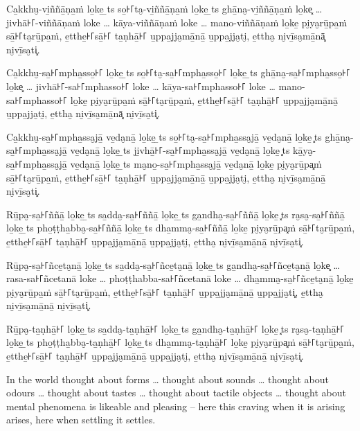 \paliPage

Ca̱kkhu̮-vi̱ññā̱ṇa̱ṁ lo̱ke̱ \ldo̱ts{} so̱꜔꜒ta̮-vi̱ññā̱ṇa̱ṁ lo̱ke̱ \ldo̱ts{} ghā̱na̮-vi̱ññā̱ṇa̱ṁ lo̱ke͓
\ldots{} jivhā꜔꜒-viññāṇaṁ loke \ldots{} kāya-viññāṇaṁ loke \ldots{} mano-viññāṇaṁ
lo̱ke̱ pi̮ya̮rū̱pa̱ṁ sā̱꜔꜒ta̮rū̱pa̱ṁ, e̱tthe̱꜔꜒sā̱꜔꜒ ta̱ṇhā̱꜔꜒ u̱ppa̱jja̮mā̱nā̱ u̱ppa̱jja̮ti̮, e̱ttha̮ ni̮vī̱sa̮mā̱nā͓
ni̮vī̱sa̮ti͓.

Ca̱kkhu̮-sa̱꜔꜒mpha̱sso̱꜔꜒ lo̱ke̱ \ldo̱ts{} so̱꜔꜒ta̮-sa̱꜔꜒mpha̱sso̱꜔꜒ lo̱ke̱ \ldo̱ts{} ghā̱na̮-sa̱꜔꜒mpha̱sso̱꜔꜒ lo̱ke͓
\ldots{} jivhā꜔꜒-sa꜔꜒mphasso꜔꜒ loke \ldots{} kāya-sa꜔꜒mphasso꜔꜒ loke \ldots{} mano-sa꜔꜒mphasso꜔꜒
lo̱ke̱ pi̮ya̮rū̱pa̱ṁ sā̱꜔꜒ta̮rū̱pa̱ṁ, e̱tthe̱꜔꜒sā̱꜔꜒ ta̱ṇhā̱꜔꜒ u̱ppa̱jja̮mā̱nā̱ u̱ppa̱jja̮ti̮, e̱ttha̮ ni̮vī̱sa̮mā̱nā͓
ni̮vī̱sa̮ti͓.

Ca̱kkhu̮-sa̱꜔꜒mpha̱ssa̮jā̱ ve̱da̮nā̱ lo̱ke̱ \ldo̱ts{} so̱꜔꜒ta̮-sa̱꜔꜒mpha̱ssa̮jā̱ ve̱da̮nā̱ lo̱ke̱ \ldo͓ts{}
ghā̱na̮-sa̱꜔꜒mpha̱ssa̮jā̱ ve̱da̮nā̱ lo̱ke̱ \ldo̱ts{} ji̱vhā̱꜔꜒-sa̱꜔꜒mpha̱ssa̮jā̱ ve̱da̮nā̱ lo̱ke̱ \ldo͓ts{}
kā̱ya̮-sa̱꜔꜒mpha̱ssa̮jā̱ ve̱da̮nā̱ lo̱ke̱ \ldo̱ts{} ma̮no̱-sa̱꜔꜒mpha̱ssa̮jā̱ ve̱da̮nā̱ lo̱ke̱ pi̮ya̮rū̱pa͓ṁ
sā̱꜔꜒ta̮rū̱pa̱ṁ, e̱tthe̱꜔꜒sā̱꜔꜒ ta̱ṇhā̱꜔꜒ u̱ppa̱jja̮mā̱nā̱ u̱ppa̱jja̮ti̮, e̱ttha̮ ni̮vī̱sa̮mā̱nā̱ ni̮vī̱sa̮ti͓.

Rū̱pa̮-sa̱꜔꜒ññā̱ lo̱ke̱ \ldo̱ts{} sa̱dda̮-sa̱꜔꜒ññā̱ lo̱ke̱ \ldo̱ts{} ga̱ndha̮-sa̱꜔꜒ññā̱ lo̱ke̱ \ldo͓ts{}
ra̮sa̮-sa̱꜔꜒ññā̱ lo̱ke̱ \ldo̱ts{} pho̱ṭṭha̱bba̮-sa̱꜔꜒ññā̱ lo̱ke̱ \ldo̱ts{} dha̱mma̮-sa̱꜔꜒ññā̱ lo̱ke̱ pi̮ya̮rū̱pa͓ṁ
sā̱꜔꜒ta̮rū̱pa̱ṁ, e̱tthe̱꜔꜒sā̱꜔꜒ ta̱ṇhā̱꜔꜒ u̱ppa̱jja̮mā̱nā̱ u̱ppa̱jja̮ti̮, e̱ttha̮ ni̮vī̱sa̮mā̱nā̱ ni̮vī̱sa̮ti͓.

Rū̱pa̮-sa̱꜔꜒ñce̱ta̮nā̱ lo̱ke̱ \ldo̱ts{} sa̱dda̮-sa̱꜔꜒ñce̱ta̮nā̱ lo̱ke̱ \ldo̱ts{} ga̱ndha̮-sa̱꜔꜒ñce̱ta̮nā̱ lo̱ke͓
\ldots{} rasa-sa꜔꜒ñcetanā loke \ldots{} phoṭṭhabba-sa꜔꜒ñcetanā loke \ldots{}
dha̱mma̮-sa̱꜔꜒ñce̱ta̮nā̱ lo̱ke̱ pi̮ya̮rū̱pa̱ṁ sā̱꜔꜒ta̮rū̱pa̱ṁ, e̱tthe̱꜔꜒sā̱꜔꜒ ta̱ṇhā̱꜔꜒ u̱ppa̱jja̮mā̱nā̱ u̱ppa̱jja̮ti͓,
e̱ttha̮ ni̮vī̱sa̮mā̱nā̱ ni̮vī̱sa̮ti͓.

Rū̱pa̮-ta̱ṇhā̱꜔꜒ lo̱ke̱ \ldo̱ts{} sa̱dda̮-ta̱ṇhā̱꜔꜒ lo̱ke̱ \ldo̱ts{} ga̱ndha̮-ta̱ṇhā̱꜔꜒ lo̱ke̱ \ldo͓ts{}
ra̮sa̮-ta̱ṇhā̱꜔꜒ lo̱ke̱ \ldo̱ts{} pho̱ṭṭha̱bba̮-ta̱ṇhā̱꜔꜒ lo̱ke̱ \ldo̱ts{} dha̱mma̮-ta̱ṇhā̱꜔꜒ lo̱ke̱ pi̮ya̮rū̱pa͓ṁ
sā̱꜔꜒ta̮rū̱pa̱ṁ, e̱tthe̱꜔꜒sā̱꜔꜒ ta̱ṇhā̱꜔꜒ u̱ppa̱jja̮mā̱nā̱ u̱ppa̱jja̮ti̮, e̱ttha̮ ni̮vī̱sa̮mā̱nā̱ ni̮vī̱sa̮ti͓.

\englishPage

In the world thought about forms \ldots{} thought about sounds \ldots{} thought
about odours \ldots{} thought about tastes \ldots{} thought about tactile
objects \ldots{} thought about mental phenomena is likeable and pleasing -- here
this craving when it is arising arises, here when settling it settles.

